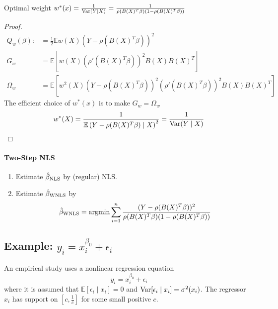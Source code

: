 \documentclass[11pt]{elegantbook}
\newcommand{\argmin}{\operatornamewithlimits{argmin}}
\begin{document}
\begin{claim}
    Optimal weight $w^*(x)=\frac{1}{\textnormal{Var}(Y|X)}=\frac{1}{\rho(B(X)^T\beta)(1-\rho(B(X)^T\beta))}$
\end{claim}
\begin{proof}
    \begin{equation}
        \begin{aligned}
            Q_w(\beta):&=\frac{1}{2}\mathbb{E}w(X)(Y-\rho(B(X)^T\beta))^2\\
            G_w&=\mathbb{E}\left[w(X)(\rho'(B(X)^T\beta))^2B(X)B(X)^T\right]\\
            \Omega_w&=\mathbb{E}\left[w^2(X)\left(Y-\rho(B(X)^T\beta)\right)^2\left(\rho'(B(X)^T\beta)\right)^2B(X)B(X)^T\right]
        \end{aligned}
        \nonumber
    \end{equation}
    The efficient choice of $w^*(x)$ is to make $G_w=\Omega_w$
    \begin{equation}
        \begin{aligned}
            w^*(X)=\frac{1}{\mathbb{E}\left(Y-\rho(B(X)^T\beta)\mid X\right)^2}=\frac{1}{\textnormal{Var}(Y\mid X)}
        \end{aligned}
        \nonumber
    \end{equation}
\end{proof}

\paragraph*{Two-Step NLS}
\begin{enumerate}
    \item Estimate $\hat{\beta}_\textnormal{NLS}$ by (regular) NLS.
    \item Estimate $\hat{\beta}_\textnormal{WNLS}$ by
    \begin{equation}
        \begin{aligned}
            \hat{\beta}_\textnormal{WNLS}=\argmin \sum_{i=1}^n \frac{(Y-\rho(B(X)^T\beta))^2}{\rho(B(X)^T\beta)(1-\rho(B(X)^T\beta))}
        \end{aligned}
        \nonumber
    \end{equation}
\end{enumerate}

\subsection{Example: $y_i=x_i^{\beta_0}+\epsilon_i$}
An empirical study uses a nonlinear regression equation $$y_i=x_i^{\beta_0}+\epsilon_i$$
where it is assumed that $\mathbb{E}[\epsilon_i\mid x_i]=0$ and $\textnormal{Var}[\epsilon_i\mid x_i]=\sigma^2(x_i)$. The regressor $x_i$ has support on $[c,\frac{1}{c}]$ for some small positive $c$.
\end{document}
